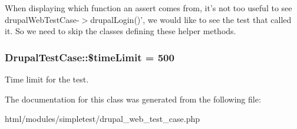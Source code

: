 When displaying which function an assert comes from, it's not too useful to see drupalWebTestCase-\/$>$drupalLogin()', we would like to see the test that called it. So we need to skip the classes defining these helper methods. \hypertarget{classDrupalTestCase_a3718dfe6f376857a54eff711c720ed01}{
\subsubsection[{\$timeLimit}]{\setlength{\rightskip}{0pt plus 5cm}DrupalTestCase::\$timeLimit = 500}}
\label{classDrupalTestCase_a3718dfe6f376857a54eff711c720ed01}
Time limit for the test. 

The documentation for this class was generated from the following file:\begin{DoxyCompactItemize}
\item 
html/modules/simpletest/drupal\_\-web\_\-test\_\-case.php\end{DoxyCompactItemize}
